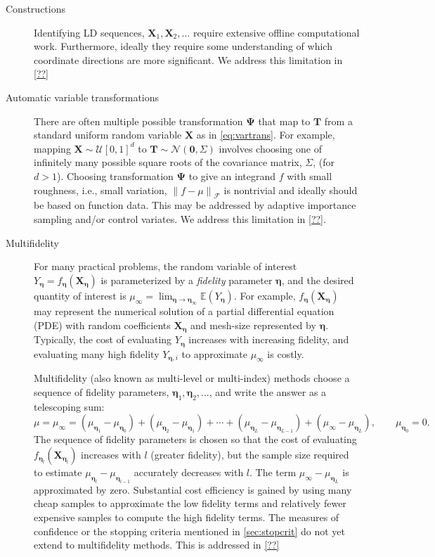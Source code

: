 \documentclass[11pt]{NSFamsart}
\newcommand{\fidparam}{\bldeta}
\newcommand{\bbE}{\mathbb{E}}
\newcommand{\mSigma}{\mathsf{\Sigma}}
\newcommand{\bzero}{\boldsymbol{0}}
\newcommand{\bT}{{\boldsymbol{T}}}
\newcommand{\bX}{{\boldsymbol{X}}}
\newcommand{\bPsi}{{\boldsymbol{\Psi}}}
\newcommand{\bldeta}{{\boldsymbol{\eta}}}
\newcommand{\calf}{{\mathcal{F}}}
\newcommand{\caln}{{\mathcal{N}}}
\newcommand{\calu}{{\mathcal{U}}}
\newcommand{\norm}[2][{}]{\ensuremath{\left \lVert #2 \right \rVert}_{#1}}
\begin{document}
\begin{description}

\item[Constructions] Identifying LD sequences, $\bX_1, \bX_2, \ldots$ require extensive offline computational work.  Furthermore, ideally they require some understanding of which coordinate directions are more significant. We address this limitation in  \cref{??} 

\item[Automatic variable transformations]  There are often multiple possible transformation $\bPsi$ that map to $\bT$ from a standard uniform random variable $\bX$ as in \eqref{eq:vartrans}.  For example, mapping $\bX \sim \calu[0,1]^d$ to $\bT \sim \caln(\bzero,\mSigma)$  involves choosing one of infinitely many possible square roots of the covariance matrix, $\mSigma$, (for $d>1$).  Choosing transformation $\bPsi$ to give an integrand $f$ with small roughness, i.e., small variation, $\norm[\calf]{f - \mu}$ is nontrivial and ideally should be based on function data. This may be addressed by adaptive importance sampling and/or  control variates. We address this limitation in \cref{??}.

\item[Multifidelity] For many practical problems, the random variable of interest $Y_\fidparam = f_\fidparam(\bX_\fidparam)$ is parameterized by a \emph{fidelity} parameter $\fidparam$, and the desired quantity of interest is $\mu_\infty = \lim_{\fidparam \to \fidparam_\infty} \bbE(Y_\fidparam)$.  For example, $f_\fidparam(\bX_\fidparam)$ may represent the numerical solution of  a partial differential equation (PDE) with random coefficients $\bX_\fidparam$ and mesh-size represented by $\fidparam$.  Typically, the cost of evaluating $Y_\fidparam$ increases with increasing fidelity, and evaluating many high fidelity $Y_{\fidparam,i}$ to approximate $\mu_\infty$ is costly.

Multifidelity (also known as multi-level or multi-index) methods \cite{Hei01a, Gil15a, HajNobTem16a} choose a sequence of fidelity parameters, $\fidparam_1, \fidparam_2, \ldots$, and write the  answer as a telescoping sum: 
\[
\mu = \mu_\infty = (\mu_{\fidparam_1} - \mu_{\fidparam_0}) + (\mu_{\fidparam_2} - \mu_{\fidparam_1}) + \cdots +
(\mu_{\fidparam_L} - \mu_{\fidparam_{L-1}}) + (\mu_{\infty} - \mu_{\fidparam_{L}}), \qquad \mu_{\fidparam_0} = 0.
\]
The sequence of fidelity parameters is chosen so that the cost of evaluating $f_{\fidparam_l}(\bX_{\fidparam_l})$  increases with $l$ (greater fidelity), but  the sample size required to estimate $\mu_{\fidparam_l} - \mu_{\fidparam_{l-1}}$ accurately decreases with $l$. The term  $\mu_{\infty} - \mu_{\fidparam_{L}}$ is approximated by zero. Substantial cost efficiency is gained by using many cheap samples to approximate the low fidelity terms and relatively fewer expensive samples to compute the high fidelity terms.  The measures of confidence or the stopping criteria mentioned in  \cref{sec:stopcrit} do not yet extend to multifidelity methods.  This is addressed in  \cref{??}


\end{description}
\end{document}
